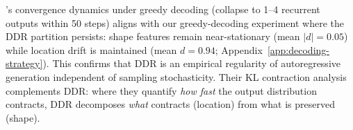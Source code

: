 \citet{markovian_chains}'s convergence dynamics under greedy decoding (collapse to 1--4 recurrent outputs within 50 steps) aligns with our greedy-decoding experiment where the DDR partition persists: shape features remain near-stationary (mean $|d|{=}0.05$) while location drift is maintained (mean $d{=}0.94$; Appendix~\ref{app:decoding-strategy}). This confirms that DDR is an empirical regularity of autoregressive generation independent of sampling stochasticity.
Their KL contraction analysis complements DDR: where they quantify \emph{how fast} the output distribution contracts, DDR decomposes \emph{what} contracts (location) from what is preserved (shape).
